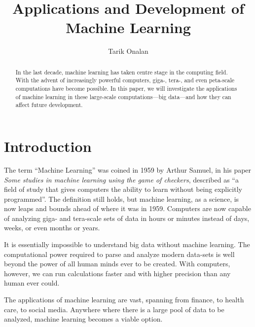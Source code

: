 \documentclass[a4paper]{comjnl}
\numberwithin{equation}{subsection}
\begin{document}
    \title{Applications and Development of Machine Learning}
    \author{Tarik Onalan}


    \begin{abstract}

        In the last decade, machine learning has taken centre stage in the computing field. With the
        advent of increasingly powerful computers, giga-, tera-, and even peta-scale computations have
        become possible. In this paper, we will investigate the applications of machine learning in
        these large-scale computations---big data---and how they can affect future development.

    \end{abstract}

    \maketitle



    \section{Introduction}
        
        The term ``Machine Learning'' was coined in 1959 by Arthur Samuel, in his paper \textit{Some
        studies in machine learning using the game of checkers}, described as ``a field
        of study that gives computers the ability to learn without being explicitly programmed''. The
        definition still holds, but machine learning, as a science, is now leaps and bounds ahead of
        where it was in 1959. Computers are now capable of analyzing giga- and tera-scale sets of data
        in hours or minutes instead of days, weeks, or even months or years.

        It is essentially impossible to understand big data without machine learning. The computational
        power required to parse and analyze modern data-sets is well beyond the power of all human minds
        ever to be created. With computers, however, we can run calculations faster and with higher
        precision than any human ever could.

        The applications of machine learning are vast, spanning from finance, to health care, to social
        media. Anywhere where there is a large pool of data to be analyzed, machine learning becomes a
        viable option.
\end{document}
